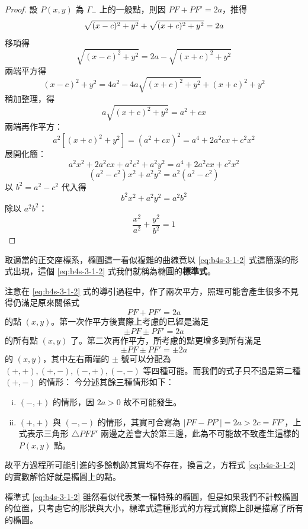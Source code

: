 \begin{proof}
設 $P(x,y)$ 為 $\Gamma_-$ 上的一般點，則因 $PF + PF' = 2a$，推得
\begin{equation}
\sqrt{(x-c)^2 + y^2} + \sqrt{(x+c)^2 + y^2} = 2a \notag
\end{equation}
移項得
\[ \sqrt{(x-c)^2 + y^2} = 2a - \sqrt{(x+c)^2 + y^2} \]
兩端平方得
\[ (x-c)^2 + y^2 = 4a^2 - 4a\sqrt{(x+c)^2 + y^2} + (x+c)^2 + y^2 \]
稍加整理，得
\begin{equation}
a\sqrt{(x+c)^2 + y^2} = a^2 + cx \label{eq:b4s-3-1-3}
\end{equation}
兩端再作平方：
\[ a^2[(x+c)^2 + y^2] = (a^2 + cx)^2 = a^4 + 2a^2cx + c^2x^2 \]
展開化簡：
\[ a^2x^2 + 2a^2cx + a^2c^2 + a^2y^2 = a^4 + 2a^2cx + c^2x^2 \]
\begin{equation}
(a^2 - c^2)x^2 + a^2y^2 = a^2(a^2 - c^2) \label{eq:b4s-3-1-4}
\end{equation}
以 $b^2 = a^2 - c^2$ 代入得
\[ b^2x^2 + a^2y^2 = a^2b^2 \]
除以 $a^2b^2$：
\[ \frac{x^2}{a^2} + \frac{y^2}{b^2} = 1 \]
\end{proof}

取適當的正交座標系，橢圓這一看似複雜的曲線竟以 \eqref{eq:b4s-3-1-2} 式這簡潔的形式出現，這個 \eqref{eq:b4s-3-1-2} 式我們就稱為橢圓的\textbf{標準式}。

注意在 \eqref{eq:b4s-3-1-2} 式的導引過程中，作了兩次平方，照理可能會產生很多不見得仍滿足原來關係式
\[ PF + PF' = 2a \]
的點 $(x,y)$。第一次作平方後實際上考慮的已經是滿足
\[ \pm PF \pm PF' = 2a \]
的所有點 $(x,y)$ 了。第二次再作平方，所考慮的點更增多到所有滿足
\[ \pm PF \pm PF' = \pm 2a \]
的 $(x,y)$，其中左右兩端的 $\pm$ 號可以分配為 $(+,+), (+,-), (-,+), (-,-)$ 等四種可能。而我們的式子只不過是第二種 $(+,-)$ 的情形：
今分述其餘三種情形如下：
\begin{enumerate}[(i)]
  \item $(-,+)$ 的情形，因 $2a > 0$ 故不可能發生。
  \item $(+,+)$ 與 $(-,-)$ 的情形，其實可合寫為 $|PF - PF'| = 2a > 2c = FF'$，上式表示三角形 $\triangle PFF'$ 兩邊之差會大於第三邊，此為不可能故不致產生這樣的 $P(x,y)$ 點。
\end{enumerate}
故平方過程所可能引進的多餘軌跡其實均不存在，換言之，方程式 \eqref{eq:b4s-3-1-2} 的實數解恰好就是橢圓上的點。

標準式 \eqref{eq:b4s-3-1-2} 雖然看似代表某一種特殊的橢圓，但是如果我們不計較橢圓的位置，只考慮它的形狀與大小，標準式這種形式的方程式實際上卻是描寫了所有的橢圓。

